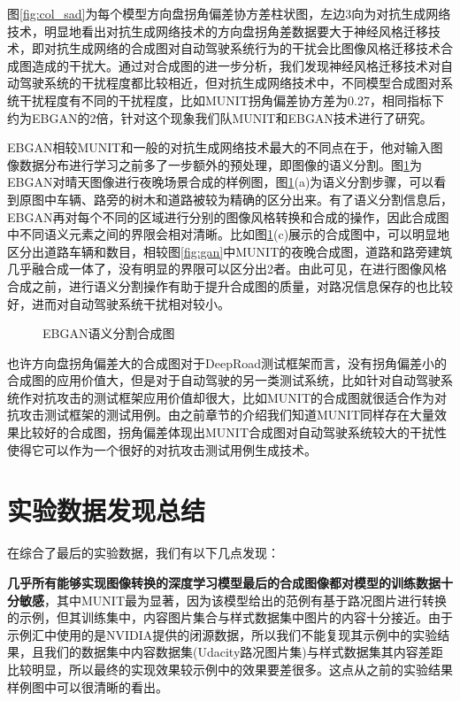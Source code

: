 图\ref{fig:col_sad}为每个模型方向盘拐角偏差协方差柱状图，左边3向为对抗生成网络技术，明显地看出对抗生成网络技术的方向盘拐角差数据要大于神经风格迁移技术，即对抗生成网络的合成图对自动驾驶系统行为的干扰会比图像风格迁移技术合成图造成的干扰大。通过对合成图的进一步分析，我们发现神经风格迁移技术对自动驾驶系统的干扰程度都比较相近，但对抗生成网络技术中，不同模型合成图对系统干扰程度有不同的干扰程度，比如MUNIT拐角偏差协方差为0.27，相同指标下约为EBGAN的2倍，针对这个现象我们队MUNIT和EBGAN技术进行了研究。

EBGAN相较MUNIT和一般的对抗生成网络技术最大的不同点在于，他对输入图像数据分布进行学习之前多了一步额外的预处理，即图像的语义分割。图\ref{fig:seg}为EBGAN对晴天图像进行夜晚场景合成的样例图，图\ref{fig:seg}(a)为语义分割步骤，可以看到原图中车辆、路旁的树木和道路被较为精确的区分出来。有了语义分割信息后，EBGAN再对每个不同的区域进行分别的图像风格转换和合成的操作，因此合成图中不同语义元素之间的界限会相对清晰。比如图\ref{fig:seg}(c)展示的合成图中，可以明显地区分出道路车辆和数目，相较图\ref{fig:gan}中MUNIT的夜晚合成图，道路和路旁建筑几乎融合成一体了，没有明显的界限可以区分出2者。由此可见，在进行图像风格合成之前，进行语义分割操作有助于提升合成图的质量，对路况信息保存的也比较好，进而对自动驾驶系统干扰相对较小。

\begin{figure}[h]
    \centering
    \caption{EBGAN语义分割合成图}
    \label{fig:seg}
\end{figure}

也许方向盘拐角偏差大的合成图对于DeepRoad测试框架而言，没有拐角偏差小的合成图的应用价值大，但是对于自动驾驶的另一类测试系统，比如针对自动驾驶系统作对抗攻击的测试框架应用价值却很大，比如MUNIT的合成图就很适合作为对抗攻击测试框架的测试用例。由之前章节的介绍我们知道MUNIT同样存在大量效果比较好的合成图，拐角偏差体现出MUNIT合成图对自动驾驶系统较大的干扰性使得它可以作为一个很好的对抗攻击测试用例生成技术。

\section{实验数据发现总结}

在综合了最后的实验数据，我们有以下几点发现：

\textbf{几乎所有能够实现图像转换的深度学习模型最后的合成图像都对模型的训练数据十分敏感}，其中MUNIT最为显著，因为该模型给出的范例有基于路况图片进行转换的示例，但其训练集中，内容图片集合与样式数据集中图片的内容十分接近。由于示例汇中使用的是NVIDIA提供的闭源数据，所以我们不能复现其示例中的实验结果，且我们的数据集中内容数据集(Udacity路况图片集)与样式数据集其内容差距比较明显，所以最终的实现效果较示例中的效果要差很多。这点从之前的实验结果样例图中可以很清晰的看出。

